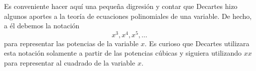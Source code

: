 Es conveniente hacer aquí una pequeña digresión y contar que Decartes hizo
algunos aportes a la teoría de ecuaciones polinomiales de una variable. De
hecho, a él debemos la notación 
\[
	x^3,x^4,x^5,\dots
\]
para representar las potencias de la variable $x$. Es curioso que Decartes
utilizara esta notación solamente a partir de las potencias cúbicas y siguiera
utilizando $xx$ para representar al cuadrado de la variable $x$. 

